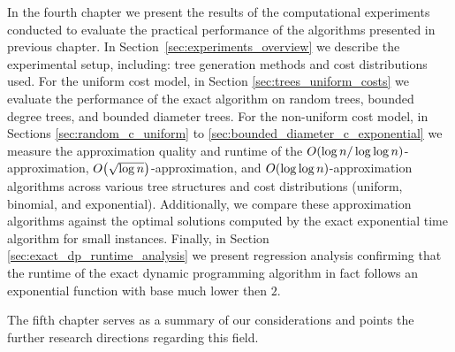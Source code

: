 In the fourth chapter we present the results of the computational experiments conducted to evaluate the practical performance of the algorithms presented in previous chapter. In Section~\ref{sec:experiments_overview} we describe the experimental setup, including: tree generation methods and cost distributions used. For the uniform cost model, in Section \ref{sec:trees_uniform_costs} we evaluate the performance of the exact algorithm on random trees, bounded degree trees, and bounded diameter trees. For the non-uniform cost model, in Sections \ref{sec:random_c_uniform} to \ref{sec:bounded_diameter_c_exponential} we measure the approximation quality and runtime of the $O\mathopen{}\left( \log n/\log \log n \right)$-approximation, $O\mathopen{}\left( \sqrt{\log n} \right)$-approximation, and $O\mathopen{}\left( \log \log n \right)$-approximation algorithms across various tree structures and cost distributions (uniform, binomial, and exponential). Additionally, we compare these approximation algorithms against the optimal solutions computed by the exact exponential time algorithm for small instances. Finally, in Section \ref{sec:exact_dp_runtime_analysis} we present regression analysis confirming that the runtime of the exact dynamic programming algorithm in fact follows an exponential function with base much lower then $2$.

The fifth chapter serves as a summary of our considerations and points the further research directions regarding this field.
